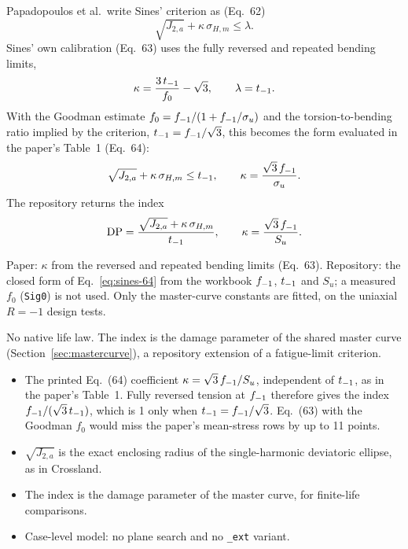  Papadopoulos et al.\ write Sines' criterion as (Eq.~62)
\begin{equation}
\sqrt{J_{2,a}} + \kappa\,\sigma_{H,m} \le \lambda .
\label{eq:sines-main}
\end{equation}
Sines' own calibration (Eq.~63) uses the fully reversed and repeated bending limits,
\begin{equation}
\kappa = \frac{3\,t_{-1}}{f_0} - \sqrt3 , \qquad \lambda = t_{-1} .
\label{eq:sines-63}
\end{equation}
With the Goodman estimate $f_0=f_{-1}/(1+f_{-1}/\sigma_u)$ and the torsion-to-bending ratio implied by the
criterion, $t_{-1}=f_{-1}/\sqrt3$, this becomes the form evaluated in the paper's Table~1 (Eq.~64):
\begin{equation}
\sqrt{J_{2,a}} + \kappa\,\sigma_{H,m} \le t_{-1} , \qquad \kappa = \frac{\sqrt3\,f_{-1}}{\sigma_u} .
\label{eq:sines-64}
\end{equation}
The repository returns the index
\begin{equation}
\mathrm{DP} = \frac{\sqrt{J_{2,a}} + \kappa\,\sigma_{H,m}}{t_{-1}} , \qquad \kappa = \frac{\sqrt3\,f_{-1}}{S_u} .
\label{eq:sines-index}
\end{equation}

 Paper: $\kappa$ from the reversed and repeated bending limits
(Eq.~63). Repository: the closed form of Eq.~\eqref{eq:sines-64} from the workbook $f_{-1}$, $t_{-1}$ and
$S_u$; a measured $f_0$ (\texttt{Sig0}) is not used. Only the master-curve constants are fitted, on
the uniaxial $R=-1$ design tests.

 No native life law. The index is the damage parameter of the shared master curve
(Section~\ref{sec:mastercurve}), a repository extension of a fatigue-limit criterion.

\begin{itemize}
\item The printed Eq.~(64) coefficient $\kappa=\sqrt3\,f_{-1}/S_u$, independent of $t_{-1}$, as in the
  paper's Table~1. Fully reversed tension at $f_{-1}$ therefore gives the index $f_{-1}/(\sqrt3\,t_{-1})$,
  which is 1 only when $t_{-1}=f_{-1}/\sqrt3$. Eq.~(63) with the Goodman $f_0$ would miss the paper's
  mean-stress rows by up to 11 points.
\item $\sqrt{J_{2,a}}$ is the exact enclosing radius of the single-harmonic deviatoric ellipse, as in
  Crossland.
\item The index is the damage parameter of the master curve, for finite-life comparisons.
\item Case-level model: no plane search and no \texttt{\_ext} variant.
\end{itemize}

